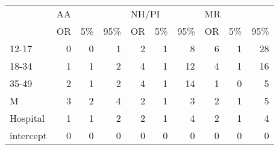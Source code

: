\centering\begin{tabular}{lrrrrrrrrr}
\toprule
{} & \multicolumn{3}{l}{AA} & \multicolumn{3}{l}{NH/PI} & \multicolumn{3}{l}{MR} \\
{} & OR & 5\% & 95\% &    OR & 5\% & 95\% & OR & 5\% & 95\% \\
\midrule
12-17     &  0 &  0 &   1 &     2 &  1 &   8 &  6 &  1 &  28 \\
18-34     &  1 &  1 &   2 &     4 &  1 &  12 &  4 &  1 &  16 \\
35-49     &  2 &  1 &   2 &     4 &  1 &  14 &  1 &  0 &   5 \\
M         &  3 &  2 &   4 &     2 &  1 &   3 &  2 &  1 &   5 \\
Hospital  &  1 &  1 &   2 &     2 &  1 &   4 &  2 &  1 &   4 \\
intercept &  0 &  0 &   0 &     0 &  0 &   0 &  0 &  0 &   0 \\
\bottomrule
\end{tabular}
